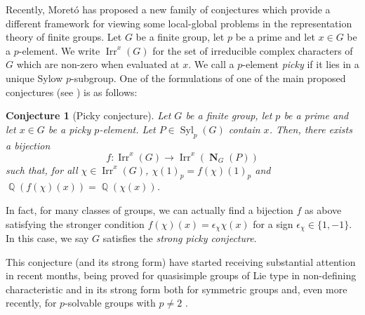 \documentclass[12pt]{amsart}
\DeclareMathOperator{\Q}{\mathbb{Q}}
\DeclareMathOperator{\NB}{\mathbf{N}}
\DeclareMathOperator{\Syl}{Syl}
\DeclareMathOperator{\Irr}{Irr}
\theoremstyle{remark}
\theoremstyle{definition}
\theoremstyle{plain}
\newtheorem*{conUn}{Conjecture}
\theoremstyle{definition}
\numberwithin{equation}{section}
\begin{document}
Recently, Moretó \cite{Mor} has proposed a new family of conjectures which provide a different
framework for viewing some local-global problems in the representation theory of finite groups. Let $G$ be a finite group, let $p$ be a prime and let $x \in G$ be a $p$-element. We write $\Irr^x(G)$ for the set of irreducible complex characters of $G$ which are non-zero when evaluated at $x$. We call a $p$-element \emph{picky} if it lies in a unique Sylow $p$-subgroup. One of the formulations of one of the main proposed conjectures (see \cite[Conjecture A]{Mor}) is as follows:
\begin{conUn}[Picky conjecture]
	Let $G$ be a finite group, let $p$ be a prime and let $x \in G$ be a picky $p$-element. Let $P \in \Syl_p(G)$ contain $x$. Then, there exists a bijection
	\begin{equation*}
		f: \Irr^x(G) \to \Irr^x(\NB_G(P))
	\end{equation*}
	such that, for all $\chi \in \Irr^x(G)$, $\chi(1)_p = f(\chi)(1)_p$ and $\Q(f(\chi)(x)) = \Q(\chi(x))$.
\end{conUn}
In fact, for many classes of groups, we can actually find a bijection $f$ as above satisfying the stronger condition $f(\chi)(x) = \epsilon_\chi \chi(x)$ for a sign $\epsilon_\chi \in \{1, -1\}$. In this case, we say $G$ satisfies the \emph{strong picky conjecture}.

This conjecture (and its strong form) have started receiving substantial attention in recent months, being proved for quasisimple groups of Lie type in non-defining characteristic \cite{GunterMandiPicky} and in its strong form both for symmetric groups \cite{SymmetricPicky} and, even more recently, for $p$-solvable groups with $p \neq 2$ \cite{PickyPSolvable}.
\end{document}

